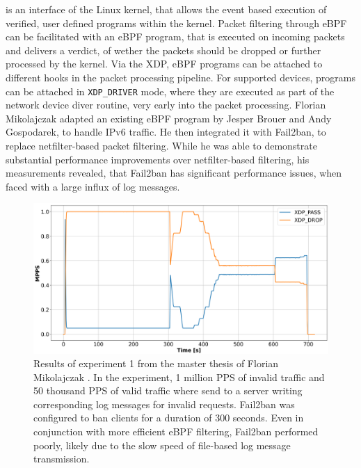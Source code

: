 is an interface of the Linux kernel, that allows the event based execution of verified, user defined programs within the kernel. Packet filtering through \ac{eBPF} can be facilitated with an \ac{eBPF} program,
that is executed on incoming packets and delivers a verdict, of wether the packets should be dropped or further processed by the kernel. Via the \ac{XDP}, \ac{eBPF} programs can be attached to different hooks in 
the packet processing pipeline. For supported devices, programs can be attached in \texttt{XDP\_DRIVER} mode, where they are executed as part of the network device diver routine, very early into the packet processing. Florian Mikolajczak adapted an existing \ac{eBPF} program by Jesper Brouer
and Andy Gospodarek, to handle \ac{IPv6} traffic. He then integrated it with Fail2ban, to replace netfilter-based packet filtering. While he was able to demonstrate substantial performance improvements over netfilter-based filtering, his measurements 
revealed, that Fail2ban has significant performance issues, when faced with a large influx of log messages. 

\begin{figure}[h!]
	\centering
	\scriptsize
    \centerline{\includegraphics[width=1.2\textwidth]{images/Fail2Ban2.png}}
    \caption[Fail2ban measurement by \cite{mikolajczak2022}]{Results of experiment 1 from the  master thesis of Florian Mikolajczak \cite{mikolajczak2022}. In the experiment, 1 million \ac{PPS} of invalid traffic and 50 thousand \ac{PPS} of valid traffic where send to a server writing corresponding log messages for invalid requests. Fail2ban was 
	configured to ban clients for a duration of 300 seconds. Even in conjunction with more efficient \ac{eBPF} filtering, Fail2ban performed poorly, likely due to the slow speed of file-based log message transmission.}
	\label{fig:fail2ban:mikolajczak2022}
\end{figure}

